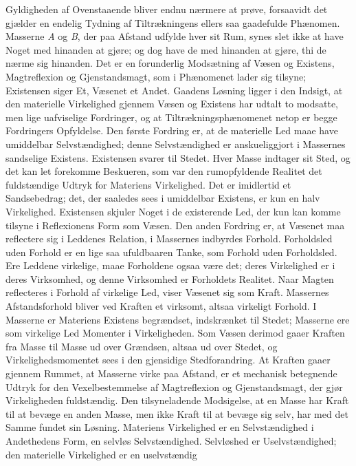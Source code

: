 \documentclass[12pt,a4paper]{book}
\begin{document}
Gyldigheden af Ovenstaaende bliver endnu nærmere at prøve, forsaavidt
det gjælder en endelig Tydning af Tiltrækningens ellers saa gaadefulde
Phænomen. Masserne \textit{A} og \textit{B}, der paa Afstand udfylde
hver sit Rum, synes slet ikke at have Noget med hinanden at gjøre; og
dog have de med hinanden at gjøre, thi de nærme sig hinanden. Det er
en
forunderlig Modsætning af Væsen og Existens, Magtreflexion og
Gjenstandsmagt, som i Phænomenet lader sig tilsyne; Existensen siger
Et, Væsenet et Andet. Gaadens Løsning ligger i den Indsigt, at den
materielle Virkelighed gjennem Væsen og Existens har udtalt to
modsatte, men lige uafviselige Fordringer, og at
Tiltrækningsphænomenet netop er begge Fordringers Opfyldelse. Den
første Fordring er, at de materielle Led maae have umiddelbar
Selvstændighed; denne Selvstændighed er anskueliggjort i Massernes
sandselige Existens. Existensen svarer til Stedet. Hver Masse
indtager sit Sted, og det kan let forekomme Beskueren, som var den
rumopfyldende Realitet det fuldstændige Udtryk for Materiens
Virkelighed. Det er imidlertid et Sandsebedrag; det, der saaledes sees
i umiddelbar Existens, er kun en halv Virkelighed. Existensen skjuler
Noget i de existerende Led, der kun kan komme tilsyne i Reflexionens
Form som Væsen. Den anden Fordring er, at Væsenet maa reflectere sig i
Leddenes Relation, i Massernes indbyrdes Forhold. Forholdsled uden
Forhold er en lige saa ufuldbaaren Tanke, som Forhold uden Forholdsled.
Ere Leddene virkelige, maae Forholdene ogsaa være det; deres
Virkelighed er i deres Virksomhed, og denne Virksomhed er Forholdets
Realitet. Naar Magten reflecteres i Forhold af virkelige Led, viser
Væsenet sig som Kraft. Massernes Afstandsforhold bliver ved Kraften et
virksomt, altsaa virkeligt Forhold. I Masserne er Materiens Existens
begrændset, indskrænket til Stedet; Masserne ere som virkelige Led
Momenter i Virkeligheden. Som Væsen derimod gaaer Kraften fra Masse
til Masse ud over Grændsen, altsaa ud over Stedet, og
Virkelighedsmomentet sees i den gjensidige Stedforandring. At Kraften
gaaer gjennem Rummet, at Masserne virke paa Afstand, er et mechanisk
betegnende Udtryk for den Vexelbestemmelse af Magtreflexion og
Gjenstandsmagt, der gjør Virkeligheden fuldstændig.
Den tilsyneladende Modsigelse, at en Masse har Kraft til at bevæge en
anden Masse, men ikke Kraft til at bevæge sig selv, har med det Samme
fundet sin Løsning. Materiens Virkelighed er en Selvstændighed i
Andethedens Form, en selvløs Selvstændighed. Selvløshed er
Uselvstændighed; den materielle Virkelighed er en uselvstændig
\end{document}
